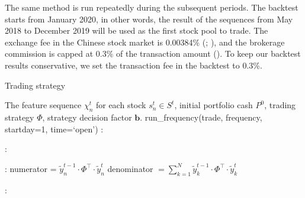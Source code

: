 \documentclass[preprint,12pt]{elsarticle}
\begin{document}

The same method is run repeatedly during the subsequent periods. The backtest starts from January 2020, in other words, the result of the sequences from May 2018 to December 2019 will be used as the first stock pool to trade. The exchange fee in the Chinese stock market is 0.00384\% (\citealp{sse_charge_table}; \citealp{szse_charge_table}), and the brokerage commission is capped at 0.3\% of the transaction amount (\citealp{transaction_fee_rule}). To keep our backtest results conservative, we set the transaction fee in the backtest to 0.3\%.


\begin{algorithm}[ht]
\caption{Trading strategy}
\begin{algorithmic}[1]
\Require The feature sequence $\chi^{t}_{n}$ for each stock $s^t_n  \in S^t$, initial portfolio cash $P^0$, trading strategy $\Phi$, strategy decision factor $\mathbf{b}$.
\State run\_frequency(trade, frequency, startday=1, time=`open')
:
\EndFunction

:
\EndFunction

:
    \State numerator = $\tilde{y}^{t-1}_n \cdot \Phi^\top \cdot \tilde{y}^t_n$ \;
    \State denominator $= \sum_{k=1}^N \tilde{y}^{t-1}_k \cdot \Phi^\top \cdot \tilde{y}^t_k$ \;
    \State {}
\EndFunction

:
    \EndFor
\EndFunction
\end{algorithmic}
\label{strategy}
\end{algorithm}
        
\end{document}
